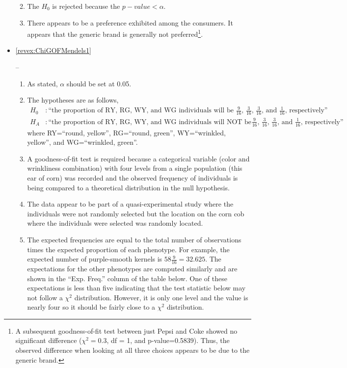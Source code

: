 \documentclass[10pt,openany]{book}\usepackage[]{graphicx}\usepackage[]{color}
\newenvironment{knitrout}{}{} %
\begin{document}
\begin{itemize}
\begin{enumerate}
\begin{knitrout}
\end{knitrout}
    \item The $H_{0}$ is rejected because the $p-value<\alpha$.
    \item There appears to be a preference exhibited among the consumers.  It appears that the generic brand is generally not preferred\footnote{A subsequent goodness-of-fit test between just Pepsi and Coke showed no significant difference ($\chi^{2}=0.3$, df = 1, and p-value=0.5839).  Thus, the observed difference when looking at all three choices appears to be due to the generic brand.}.
  \end{enumerate}
  \item \hypertarget{ans:ChiGOFMendels1}{\ref{revex:ChiGOFMendels1}} --
    \begin{enumerate}
      \item As stated, $\alpha$ should be set at 0.05.
      \item The hypotheses are as follows,
\[ \begin{split}
  H_{0}&: \text{``the proportion of RY, RG, WY, and WG individuals will be $\frac{9}{16}$, $\frac{3}{16}$, $\frac{3}{16}$, and $\frac{1}{16}$, respectively''} \\
  H_{A}&: \text{``the proportion of RY, RG, WY, and WG individuals will NOT be $\frac{9}{16}$, $\frac{3}{16}$, $\frac{3}{16}$, and $\frac{1}{16}$, respectively''}
\end{split} \]
where RY=``round, yellow'', RG=``round, green'', WY=``wrinkled, yellow'', and WG=``wrinkled, green''.
      \item A goodness-of-fit test is required because a categorical variable (color and wrinkliness combination) with four levels from a single population (this ear of corn) was recorded and the observed frequency of individuals is being compared to a theoretical distribution in the null hypothesis.
      \item The data appear to be part of a quasi-experimental study where the individuals were not randomly selected but the location on the corn cob where the individuals were selected was randomly located.
      \item The expected frequencies are equal to the total number of observations times the expected proportion of each phenotype.  For example, the expected number of purple-smooth kernels is $58\frac{9}{16}=32.625$.  The expectations for the other phenotypes are computed similarly and are shown in the ``Exp. Freq.'' column of the table below.  One of these expectations is less than five indicating that the test statistic below may not follow a $\chi^{2}$ distribution.  However, it is only one level and the value is nearly four so it should be fairly close to a $\chi^{2}$ distribution.

\end{enumerate}
\end{itemize}
\end{document}
